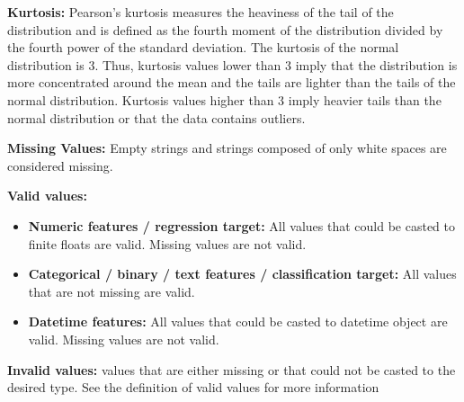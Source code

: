 \documentclass[11pt]{article}
\providecommand{\tightlist}{%
      \setlength{\itemsep}{0pt}\setlength{\parskip}{0pt}}
\begin{document}
\textbf{Kurtosis:} Pearson's kurtosis measures the heaviness of the tail
of the distribution and is defined as the fourth moment of the
distribution divided by the fourth power of the standard deviation. The
kurtosis of the normal distribution is 3. Thus, kurtosis values lower
than 3 imply that the distribution is more concentrated around the mean
and the tails are lighter than the tails of the normal distribution.
Kurtosis values higher than 3 imply heavier tails than the normal
distribution or that the data contains outliers.

\textbf{Missing Values:} Empty strings and strings composed of only
white spaces are considered missing.

\textbf{Valid values:}

\begin{itemize}
\tightlist
\item
  \textbf{Numeric features / regression target:} All values that could
  be casted to finite floats are valid. Missing values are not valid.
\item
  \textbf{Categorical / binary / text features / classification target:}
  All values that are not missing are valid.
\item
  \textbf{Datetime features:} All values that could be casted to
  datetime object are valid. Missing values are not valid.
\end{itemize}

\textbf{Invalid values:} values that are either missing or that could
not be casted to the desired type. See the definition of valid values
for more information


    
    
    
\end{document}
